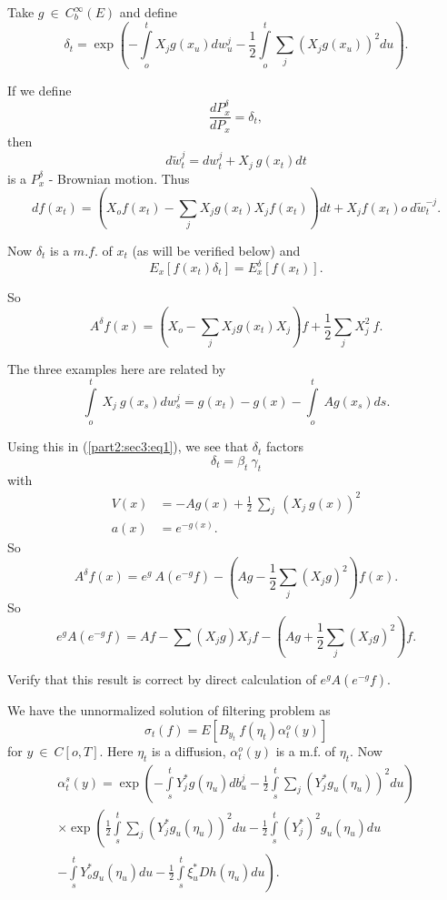 Take $g ~ \in  ~ C^\infty_b(E)$ and define
\begin{equation}
  \delta_t = \exp\left(-\int\limits^t_o X_jg(x_u)dw^j_u - \frac{1}{2}
  \int\limits^t_o \sum_j(X_j g(x_u))^2 du\right).\tag{1}\label{part2:sec3:eq1} 
\end{equation}

If we define
$$
\frac{dP^\delta_x}{dP_x} = \delta_t,
$$
then
$$
d \tilde{w}^j_t = dw^j_t + X_j~ g(x_t)dt
$$
is a $P^\delta_x$ - Brownian motion. Thus
$$
df(x_t) = (X_o f (x_t) - \sum_j X_j g(x_t)X_j f(x_t))dt + X_jf(x_t)o ~
d\tilde{w}^{-j}_t. 
$$

Now $\delta_t$ is a $m.f$. of $x_t$ (as will be verified below) and 
$$
E_x[f(x_t)\delta_t] = E^\delta_x[f(x_t)].
$$

So\pageoriginale 
$$
A ^{\delta}f(x) = \left(X_o - \sum_j X_j g(x_t)X_j\right)f +
\frac{1}{2} \sum_j X_j^2 ~ f. 
$$

The three examples here are related by 
$$
\int\limits^t_o ~X_j ~g(x_s)dw^j_s = g(x_t) - g(x) - \int\limits^t_o
~Ag(x_s)ds. 
$$

Using this in (\ref{part2:sec3:eq1}), we see that $\delta_t$ factors
$$
\delta_t = \beta_t ~ \gamma_t
$$
with 
\begin{align*}
  V(x) & = - Ag(x) + \frac{1}{2} ~ \sum_j ~(X_j~g(x))^2\\
  a(x) & = e^{-g(x)}.
\end{align*}
So
$$
A ^{\delta}f(x) = e^g ~ A(e^{-g}f) - \left(Ag - \frac{1}{2}\sum_j
(X_jg)^2\right) f(x).
$$
So
$$
e^gA(e^{-g}f) = Af - \sum (X_jg) X_j f - \left(Ag + \frac{1}{2} \sum_j
(X_jg)^2 \right) f. 
$$

\begin{exercise}%
  Verify that this result is correct by direct calculation of $e^g A
  (e^{-g}f)$. 
\end{exercise}

We have the unnormalized solution of filtering problem as 
$$
\sigma_t(f) = E[B_{y_t} ~ f(\eta_t) \alpha^o_t(y)]
$$
for $y ~ \in  ~ C[o,T]$. Here $\eta_t$ is a diffusion,
$\alpha^o_t(y)$ is a m.f. of $\eta_t$. Now 
\begin{multline*}
  \alpha^s_t(y)  = \exp \left(-\int\limits^t_s Y^*_j g(\eta_u)db^j_u -
  \frac{1}{2}\int\limits^t_s \sum_j (Y^*_jg_u(\eta_u))^2du\right)\\ 
   \times \exp\left(\frac{1}{2}\int\limits^t_s \sum_j (Y^*_jg_u(\eta_u))^2
  du - \frac{1}{2}\int\limits^t_s (Y^*_j)^2 g_u(\eta_u)du\right.\\ 
  \left.- \int\limits^t_s Y^*_og_u(\eta_u)du - \frac{1}{2}\int\limits^t_s
  \xi^*_u Dh(\eta_u)du\right). 
\end{multline*}


